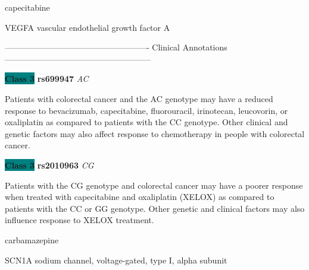 \documentclass{resume} %
\begin{document}
\begin{rSection}{ capecitabine }
\begin{rSubsection}{ VEGFA }{ vascular endothelial growth factor A }{}{}
\item[] ---------------------------------------------------- Clinical Annotations -----------------------------------------------------\newline
\item \textbf{\colorbox{teal} {Class 3}} \textbf{ rs699947 } \textit{ AC }
\item[] Patients with colorectal cancer and the AC genotype may have a reduced response to bevacizumab, capecitabine, fluorouracil, irinotecan, leucovorin, or oxaliplatin as compared to patients with the CC genotype. Other clinical and genetic factors may also affect response to chemotherapy in people with colorectal cancer.\item \textbf{\colorbox{teal} {Class 3}} \textbf{ rs2010963 } \textit{ CG }
\item[] Patients with the CG genotype and colorectal cancer may have a poorer response when treated with capecitabine and oxaliplatin (XELOX) as compared to patients with the CC or GG genotype. Other genetic and clinical factors may also influence response to XELOX treatment.
\end{rSubsection}

\end{rSection}\begin{rSection}{ carbamazepine }
\item[]

\begin{rSubsection}{ SCN1A }{ sodium channel, voltage-gated, type I, alpha subunit }{}{}
\item[]


\end{rSubsection}
\end{rSection}
\end{document}
